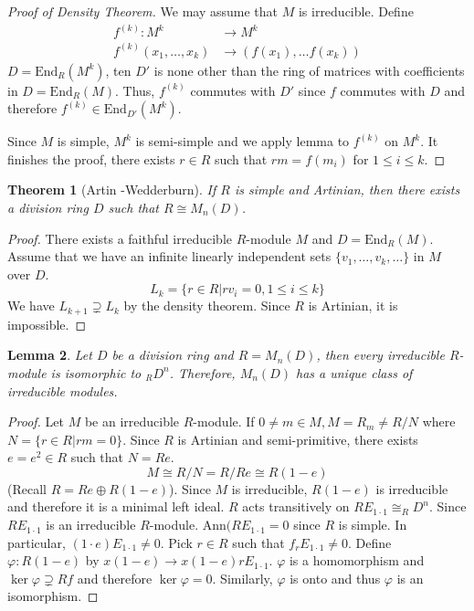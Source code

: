 \documentclass[letterpaper, leqno, 12pt]{article}
\newcommand{\Ann}{\mbox{Ann}}
\newcommand{\End}{\mbox{End}}
\theoremstyle{stdthm}
\newtheorem{thm}{Theorem}
\newtheorem{lem}[thm]{Lemma}
\theoremstyle{stddef}
\theoremstyle{stdnonum}
\theoremstyle{stdqands}
\theoremstyle{stdbold}
\begin{document}
\begin{proof} [Proof of Density Theorem]
We may assume that $M$ is irreducible. Define
\begin{align*}
 f^(k): M^k &\rightarrow M^k \\
  f^{(k)} (x_1,\dots, x_k) &\rightarrow (f(x_1),\dots f(x_k))
 \end{align*}
 $D = \End_R(M^k)$, ten $D'$ is none other than the ring of matrices with coefficients in $D = \End_R(M)$. Thus, $f^{(k)}$ commutes with $D'$ since $f$ commutes with $D$ and therefore $f^{(k)} \in \End_{D'}(M^k)$. 
 
 
Since $M$ is simple, $M^k$ is semi-simple and we apply lemma to $f^{(k)}$ on $M^k$. It finishes the proof, there exists $r \in R$ such that $rm = f(m_i)$ for $1\leq i \leq k$. 
\end{proof}

\begin{thm} [Artin -Wedderburn]
If $R$ is simple and Artinian, then there exists a division ring $D$ such that $R \cong M_n(D)$. 
\end{thm}

\begin{proof}
There exists a faithful irreducible $R$-module $M$ and $D = \End_R(M)$. Assume that we have an infinite linearly independent sets $\{v_1,\dots, v_k, \dots\}$ in $M$ over $D$. 
\[ L_k = \{r \in R| rv_i = 0, 1\leq i \leq k\} \]
We have $L_{k+1} \supsetneq L_k$ by the density theorem. Since $R$ is Artinian, it is impossible. 
\end{proof}

\begin{lem}
Let $D$ be a division ring and $R = M_n(D)$, then  every irreducible $R$-module is isomorphic to $_RD^n$. Therefore, $M_n(D)$ has a unique class of irreducible modules.   
\end{lem}

\begin{proof}
Let $M$ be an irreducible $R$-module. If $0 \neq m \in M, M = R_m \neq R/N$ where $N = \{r \in R| rm = 0\}$. Since $R$ is Artinian and semi-primitive, there exists $e = e^2 \in R$ such that $N = Re$. 
\[ M \cong R/N = R/Re \cong R(1-e) \]
(Recall $R = Re \oplus R(1-e)$).  Since $M$ is irreducible, $R(1-e)$ is irreducible and therefore it is a minimal left ideal. $R$ acts transitively on $RE_{1\cdot 1} \cong _RD^n$. Since $R E_{1\cdot 1}$ is an irreducible $R$-module. $\Ann(RE_{1\cdot 1} = 0$ since $R$ is simple.  In particular, $(1\cdot e) E_{1\cdot 1} \neq 0$. Pick $r \in R$ such that $f_r E_{1\cdot 1} \neq 0$. Define $\varphi: R(1-e)$ by $x(1-e) \rightarrow x(1-e)r E_{1\cdot 1}$. $\varphi$ is a homomorphism and $\ker \varphi \supsetneq Rf$ and therefore $\ker \varphi = 0$. Similarly, $\varphi $ is onto and thus $\varphi$ is an isomorphism.  
\end{proof}
\end{document}
